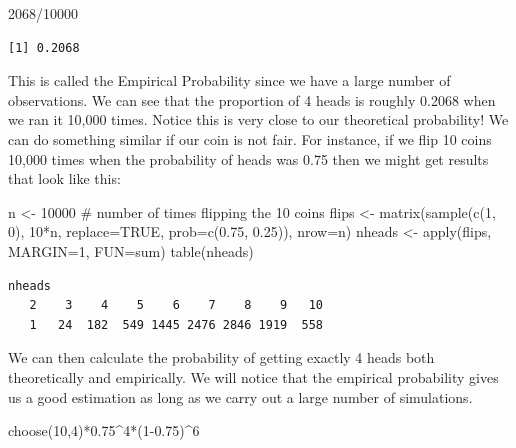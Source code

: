 \documentclass[
  letterpaper,
  DIV=11,
  numbers=noendperiod]{scrreprt}
\newenvironment{Shaded}{\begin{snugshade}}{\end{snugshade}}
\newcommand{\AttributeTok}[1]{\textcolor[rgb]{0.40,0.45,0.13}{#1}}
\newcommand{\CommentTok}[1]{\textcolor[rgb]{0.37,0.37,0.37}{#1}}
\newcommand{\ConstantTok}[1]{\textcolor[rgb]{0.56,0.35,0.01}{#1}}
\newcommand{\DecValTok}[1]{\textcolor[rgb]{0.68,0.00,0.00}{#1}}
\newcommand{\FloatTok}[1]{\textcolor[rgb]{0.68,0.00,0.00}{#1}}
\newcommand{\FunctionTok}[1]{\textcolor[rgb]{0.28,0.35,0.67}{#1}}
\newcommand{\NormalTok}[1]{\textcolor[rgb]{0.00,0.23,0.31}{#1}}
\newcommand{\OtherTok}[1]{\textcolor[rgb]{0.00,0.23,0.31}{#1}}
\newcommand{\SpecialCharTok}[1]{\textcolor[rgb]{0.37,0.37,0.37}{#1}}
\begin{document}
\begin{Shaded}
\begin{Highlighting}[]
\DecValTok{2068}\SpecialCharTok{/}\DecValTok{10000}
\end{Highlighting}
\end{Shaded}

\begin{verbatim}
[1] 0.2068
\end{verbatim}

This is called the Empirical Probability since we have a large number of
observations. We can see that the proportion of 4 heads is roughly
0.2068 when we ran it 10,000 times. Notice this is very close to our
theoretical probability! We can do something similar if our coin is not
fair. For instance, if we flip 10 coins 10,000 times when the
probability of heads was 0.75 then we might get results that look like
this:

\begin{Shaded}
\begin{Highlighting}[]
\NormalTok{n }\OtherTok{\textless{}{-}} \DecValTok{10000} \CommentTok{\# number of times flipping the 10 coins}
\NormalTok{flips }\OtherTok{\textless{}{-}} \FunctionTok{matrix}\NormalTok{(}\FunctionTok{sample}\NormalTok{(}\FunctionTok{c}\NormalTok{(}\DecValTok{1}\NormalTok{, }\DecValTok{0}\NormalTok{), }\DecValTok{10}\SpecialCharTok{*}\NormalTok{n, }\AttributeTok{replace=}\ConstantTok{TRUE}\NormalTok{, }\AttributeTok{prob=}\FunctionTok{c}\NormalTok{(}\FloatTok{0.75}\NormalTok{, }\FloatTok{0.25}\NormalTok{)), }\AttributeTok{nrow=}\NormalTok{n)}
\NormalTok{nheads }\OtherTok{\textless{}{-}} \FunctionTok{apply}\NormalTok{(flips, }\AttributeTok{MARGIN=}\DecValTok{1}\NormalTok{, }\AttributeTok{FUN=}\NormalTok{sum)}
\FunctionTok{table}\NormalTok{(nheads)}
\end{Highlighting}
\end{Shaded}

\begin{verbatim}
nheads
   2    3    4    5    6    7    8    9   10 
   1   24  182  549 1445 2476 2846 1919  558 
\end{verbatim}

We can then calculate the probability of getting exactly 4 heads both
theoretically and empirically. We will notice that the empirical
probability gives us a good estimation as long as we carry out a large
number of simulations.

\begin{Shaded}
\begin{Highlighting}[]
\FunctionTok{choose}\NormalTok{(}\DecValTok{10}\NormalTok{,}\DecValTok{4}\NormalTok{)}\SpecialCharTok{*}\FloatTok{0.75}\SpecialCharTok{\^{}}\DecValTok{4}\SpecialCharTok{*}\NormalTok{(}\DecValTok{1}\FloatTok{{-}0.75}\NormalTok{)}\SpecialCharTok{\^{}}\DecValTok{6}
\end{Highlighting}
\end{Shaded}
\end{document}
